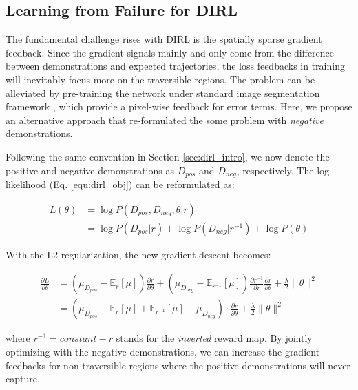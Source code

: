 \documentclass[../thesis.tex]{subfiles}
\begin{document}
\subsection{Learning from Failure for DIRL}

The fundamental challenge rises with DIRL is the spatially sparse gradient feedback. 
Since the gradient signals mainly and only come from the difference between demonstrations and expected trajectories, the loss feedbacks in training will inevitably focus more on the traversible regions.
The problem can be alleviated by pre-training the network under standard image segmentation framework \cite{wulfmeier2016incorporating}, which provide a pixel-wise feedback for error terms. 
Here, we propose an alternative approach that re-formulated the some problem with \textit{negative} demonstrations.

Following the same convention in Section \ref{sec:dirl_intro}, we now denote the positive and negative demonstrations as $D_{pos}$ and $D_{neg}$, respectively. The log likelihood (Eq. \ref{equ:dirl_obj}) can be reformulated as:

\begin{align}
L(\theta) &= \log P(D_{pos}, D_{neg},\theta|r) \\
&= \log P(D_{pos}|r) + \log P(D_{neg}|r^{-1}) + \log P(\theta)
\end{align}

With the L2-regularization, the new gradient descent becomes:

\begin{align}
\frac{\partial L}{\partial \theta} &= \left( \mu_{D_{pos}} - \mathbb{E}_{r}[\mu] \right) \frac{\partial r}{\partial \theta} + \left( \mu_{D_{neg}} - \mathbb{E}_{r^{-1}}[\mu] \right) \frac{\partial r^{-1}}{\partial r} \frac{\partial r}{\partial \theta} + \frac{\lambda}{2} \| \theta \|^2 \\
&= \left( \mu_{D_{pos}} - \mathbb{E}_{r}[\mu] + \mathbb{E}_{r^{-1}}[\mu] - \mu_{D_{neg}} \right) \cdot \frac{\partial r}{\partial \theta} + \frac{\lambda}{2} \| \theta \|^2
\end{align}

where $r^{-1} = constant - r $ stands for the \textit{inverted} reward map. 
By jointly optimizing with the negative demonstrations, we can increase the gradient feedbacks for non-traversible regions where the positive demonstrations will never capture.
\end{document}
